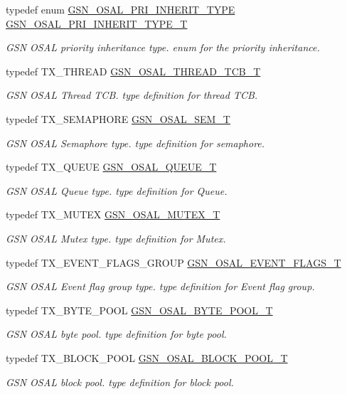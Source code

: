 \begin{DoxyCompactItemize}
typedef enum \hyperlink{a00628_ga4b070e363e5202d1c7e6ffe017b981b9}{GSN\_\-OSAL\_\-PRI\_\-INHERIT\_\-TYPE} \hyperlink{a00628_gafc2ee1bc516d2ae2d9a29757cbe45469}{GSN\_\-OSAL\_\-PRI\_\-INHERIT\_\-TYPE\_\-T}
\begin{DoxyCompactList}\small\item\em GSN OSAL priority inheritance type. enum for the priority inheritance. \end{DoxyCompactList}\item 
typedef TX\_\-THREAD \hyperlink{a00628_ga43c1eefe78fa26e478301976f96ac31f}{GSN\_\-OSAL\_\-THREAD\_\-TCB\_\-T}
\begin{DoxyCompactList}\small\item\em GSN OSAL Thread TCB. type definition for thread TCB. \end{DoxyCompactList}\item 
typedef TX\_\-SEMAPHORE \hyperlink{a00628_gab4b3554407ce22b940e2fcd3faf5fd47}{GSN\_\-OSAL\_\-SEM\_\-T}
\begin{DoxyCompactList}\small\item\em GSN OSAL Semaphore type. type definition for semaphore. \end{DoxyCompactList}\item 
typedef TX\_\-QUEUE \hyperlink{a00628_gaebe1c924d01bf6607bd65961bf134095}{GSN\_\-OSAL\_\-QUEUE\_\-T}
\begin{DoxyCompactList}\small\item\em GSN OSAL Queue type. type definition for Queue. \end{DoxyCompactList}\item 
typedef TX\_\-MUTEX \hyperlink{a00628_gae997291afc7166c897f459023e0154ad}{GSN\_\-OSAL\_\-MUTEX\_\-T}
\begin{DoxyCompactList}\small\item\em GSN OSAL Mutex type. type definition for Mutex. \end{DoxyCompactList}\item 
typedef TX\_\-EVENT\_\-FLAGS\_\-GROUP \hyperlink{a00628_gab93fdfc637101a29260ca105d3eb924e}{GSN\_\-OSAL\_\-EVENT\_\-FLAGS\_\-T}
\begin{DoxyCompactList}\small\item\em GSN OSAL Event flag group type. type definition for Event flag group. \end{DoxyCompactList}\item 
typedef TX\_\-BYTE\_\-POOL \hyperlink{a00628_gaf2af06408f9cf286dc400b5957264f00}{GSN\_\-OSAL\_\-BYTE\_\-POOL\_\-T}
\begin{DoxyCompactList}\small\item\em GSN OSAL byte pool. type definition for byte pool. \end{DoxyCompactList}\item 
typedef TX\_\-BLOCK\_\-POOL \hyperlink{a00628_ga6adbb87a82d8b5936dd6f535024d81b7}{GSN\_\-OSAL\_\-BLOCK\_\-POOL\_\-T}
\begin{DoxyCompactList}\small\item\em GSN OSAL block pool. type definition for block pool. \end{DoxyCompactList}\end{DoxyCompactItemize}

